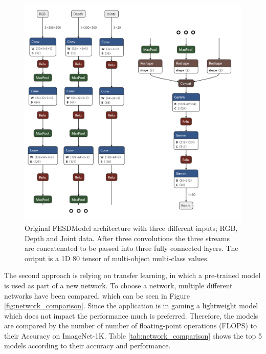 \begin{figure}[h]
  \centering
  \includegraphics[width=\linewidth]{figures/Model/FESD.png}
  \caption[FESDModel architecture version 1]{Original FESDModel architecture with three different inputs; RGB, Depth and Joint data. After three convolutions the three streams are concatenated to be passed into three fully connected layers. The output is a 1D 80 tensor of multi-object multi-class values.}
  \label{fig:model_architecture_v1}
\end{figure}
The second approach is relying on transfer learning, in which a pre-trained model is used as part of a new network. To choose a network, multiple different networks have been compared, which can be seen in Figure \ref{fig:network_comparison}. Since the application is in gaming a lightweight model which does not impact the performance much is preferred. Therefore, the models are compared by the number of number of floating-point operations (FLOPS) to their Accuracy on ImageNet-1K. Table \ref{tab:network_comparison} shows the top 5 models according to their accuracy and performance. 

